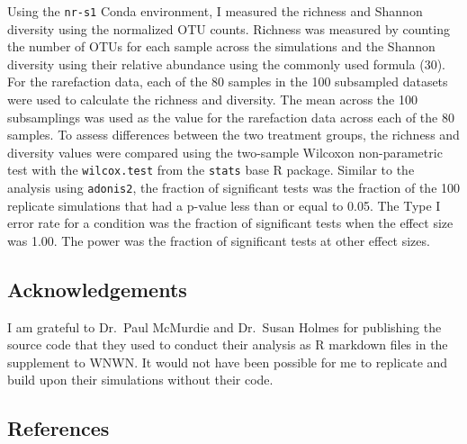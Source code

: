 \documentclass[
]{article}
\begin{document}
Using the \texttt{nr-s1} Conda environment, I measured the richness and
Shannon diversity using the normalized OTU counts. Richness was measured
by counting the number of OTUs for each sample across the simulations
and the Shannon diversity using their relative abundance using the
commonly used formula (30). For the rarefaction data, each of the 80
samples in the 100 subsampled datasets were used to calculate the
richness and diversity. The mean across the 100 subsamplings was used as
the value for the rarefaction data across each of the 80 samples. To
assess differences between the two treatment groups, the richness and
diversity values were compared using the two-sample Wilcoxon
non-parametric test with the \texttt{wilcox.test} from the
\texttt{stats} base R package. Similar to the analysis using
\texttt{adonis2}, the fraction of significant tests was the fraction of
the 100 replicate simulations that had a p-value less than or equal to
0.05. The Type I error rate for a condition was the fraction of
significant tests when the effect size was 1.00. The power was the
fraction of significant tests at other effect sizes.

\hypertarget{acknowledgements}{%
\subsection{Acknowledgements}\label{acknowledgements}}

I am grateful to Dr.~Paul McMurdie and Dr.~Susan Holmes for publishing
the source code that they used to conduct their analysis as R markdown
files in the supplement to WNWN. It would not have been possible for me
to replicate and build upon their simulations without their code.

\newpage

\hypertarget{references}{%
\subsection{References}\label{references}}

\setlength{\parindent}{-0.25in}
\setlength{\leftskip}{0.25in}

\noindent
\end{document}
